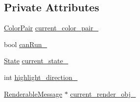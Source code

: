 \subsection*{Private Attributes}
\begin{DoxyCompactItemize}
\item 
\hyperlink{classScreen_ade5d330a53244ab5e204c9fc2a8ab235}{Color\-Pair} \hyperlink{classScreen_a806b6c5ad380d84aa7457d06e1eb98f8}{current\-\_\-color\-\_\-pair\-\_\-}
\item 
bool \hyperlink{classScreen_a7282ffbd67e23dfec94cc1a7f0a7a7e9}{can\-Run\-\_\-}
\item 
\hyperlink{classScreen_a3b2273cea4444624a4fb6542ee2ce44e}{State} \hyperlink{classScreen_a0ea09ea5eadc990cdcd32068c377287d}{current\-\_\-state\-\_\-}
\item 
int \hyperlink{classScreen_a69a30640ab25485d9f769e3a37bf8639}{highlight\-\_\-direction\-\_\-}
\item 
\hyperlink{classRenderableMessage}{Renderable\-Message} $\ast$ \hyperlink{classScreen_a404ae55aee99b0d10ccd46387ccac02e}{current\-\_\-render\-\_\-obj\-\_\-}
\end{DoxyCompactItemize}



